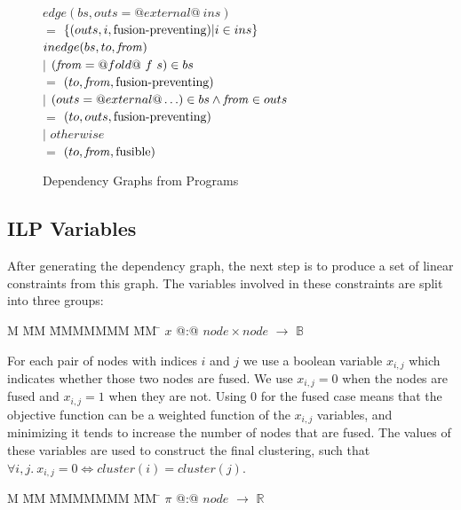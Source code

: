 \begin{figure}
\begin{tabbing}
$edge(bs, outs = @external@~ins)$  \\
    \> $=$    \> $\{(outs,i, \mbox{fusion-preventing}) | i \in ins \}$
\\[1ex]
$inedge(bs,to,\mathit{from})$ \\
    \> $|$ \> $(\mathit{from} = @fold@~f~s) \in bs$     \\
    \> $=$ \> $(to, \mathit{from}, \mbox{fusion-preventing})$  \\
    \> $|$ \> $(outs = @external@ \ldots) \in bs     \wedge \mathit{from} \in outs$     \\
    \> $=$ \> $(to, outs, \mbox{fusion-preventing})$  \\
    \> $|$ \> $otherwise$                      \\
    \> $=$ \> $(to, \mathit{from}, \mathrm{fusible})$
\end{tabbing}

\caption{Dependency Graphs from Programs}
\label{f:DependencyGraph}
\end{figure}


\subsection{ILP Variables}
After generating the dependency graph, the next step is to produce a set of linear constraints from this graph. The variables involved in these constraints are split into three groups:
\begin{tabbing}
M   \= MM \= MMMMMMM \= MM \= \kill
$x$   \> @:@  \> $node \times node$ \> $\to$ \> $\mathbb{B}$
\end{tabbing}

For each pair of nodes with indices $i$ and $j$ we use a boolean variable $x_{i,j}$ which indicates whether those two nodes are fused. We use $x_{i,j} = 0$ when the nodes are fused and $x_{i,j} = 1$ when they are not. Using $0$ for the fused case means that the objective function can be a weighted function of the $x_{i,j}$ variables, and minimizing it tends to increase the number of nodes that are fused. The values of these variables are used to construct the final clustering, such that $\forall i,j.\ x_{i,j} = 0 \iff cluster(i) = cluster(j)$.
\begin{tabbing}
M   \= MM \= MMMMMMM \= MM \= \kill
$\pi$ \> @:@  \> $node$             \> $\to$ \> $\mathbb{R}$
\end{tabbing}

